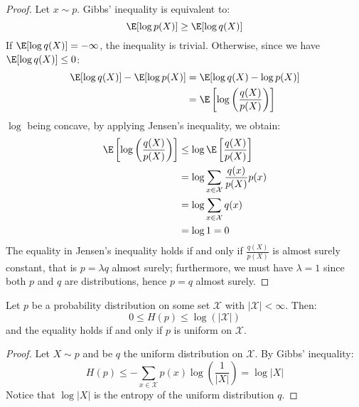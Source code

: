 \documentclass{../cs-classes/cs-classes}
\newcommand*{\X}{\mathcal{X}}
\begin{document}
\begin{proof}
    Let $x\sim p$. Gibbs' inequality is equivalent to:
    \begin{equation*}
        \E[\log p(X)] \geq \E[\log q(X)]
    \end{equation*}
    If $\E[\log q(X)] = -\infty$, the inequality is trivial. Otherwise, since we have $\E[\log q(X)] \leq 0$:
    \begin{equation*}
        \begin{aligned}
            \E[\log q(X)] - \E[\log p(X)] &= \E[\log q(X) - \log p(X)] \\
            &= \E\left[\log\left(\frac{q(X)}{p(X)}\right)\right]
        \end{aligned}
    \end{equation*}
    $\log$ being concave, by applying Jensen's inequality, we obtain:
    \begin{equation*}
        \begin{aligned}
            \E\left[\log\left(\frac{q(X)}{p(X)}\right)\right] &\leq \log\E\left[\frac{q(X)}{p(X)}\right] \\
            &= \log\sum_{x\in\X} \frac{q(x)}{p(X)}p(x)\\
            &= \log\sum_{x\in\X} q(x)\\
            &= \log 1 = 0
        \end{aligned}
    \end{equation*}
    The equality in Jensen's inequality holds if and only if $\frac{q(X)}{p(X)}$ is almost surely constant, that is $p=\lambda q$ almost surely; furthermore, we must have $\lambda=1$ since both $p$ and $q$ are distributions, hence $p=q$ almost surely. 
\end{proof}

\begin{corollary}
    Let $p$ be a probability distribution on some set $\X$ with $|\X|<\infty$. Then:
    \begin{equation*}
        0\leq H(p) \leq \log(|\X|)
    \end{equation*}
    and the equality holds if and only if $p$ is uniform on $\X$.
\end{corollary}

\begin{proof}
    Let $X \sim p$ and be $q$ the uniform distribution on $\X$. By Gibbs' inequality:
    \begin{equation*}
        H(p) \leq -\sum_{x\in\X}p(x)\log\left(\frac{1}{|X|}\right) = \log|X|
    \end{equation*}
    Notice that $\log|X|$ is the entropy of the uniform distribution $q$.
\end{proof}
\end{document}
